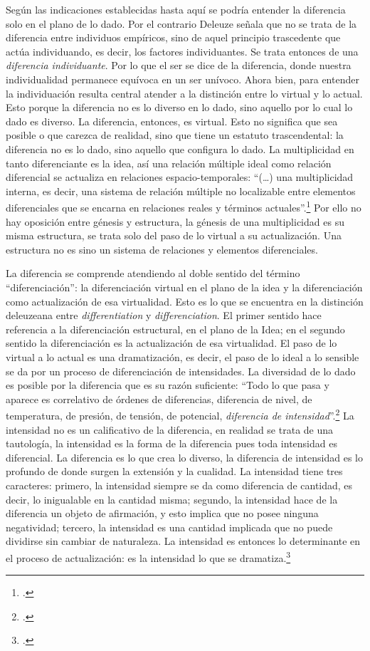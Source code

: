 Según las indicaciones establecidas hasta aquí se podría entender la
diferencia solo en el plano de lo dado. Por el contrario Deleuze señala
que no se trata de la diferencia entre individuos empíricos, sino de
aquel principio trascedente que actúa individuando, es decir, los
factores individuantes. Se trata entonces de una \emph{diferencia
individuante}. Por lo que el ser se dice de la diferencia, donde nuestra
individualidad permanece equívoca en un ser unívoco. Ahora bien, para
entender la individuación resulta central atender a la distinción entre
lo virtual y lo actual. Esto porque la diferencia no es lo diverso en lo
dado, sino aquello por lo cual lo dado es diverso. La diferencia,
entonces, es virtual. Esto no significa que sea posible o que carezca de
realidad, sino que tiene un estatuto trascendental: la diferencia no es
lo dado, sino aquello que configura lo dado. La multiplicidad en tanto
diferenciante es la idea, así una relación múltiple ideal como relación
diferencial se actualiza en relaciones espacio-temporales: \enquote{(\dots)
una multiplicidad interna, es decir, una sistema de relación múltiple no
localizable entre elementos diferenciales que se encarna en relaciones
reales y términos actuales}.\footcite[278]{deleuze2008} Por ello no hay oposición
entre génesis y estructura, la génesis de una multiplicidad es su misma
estructura, se trata solo del paso de lo virtual a su actualización. Una
estructura no es sino un sistema de relaciones y elementos
diferenciales.

La diferencia se comprende atendiendo al doble sentido del término
\enquote{diferenciación}: la diferenciación virtual en el plano de la idea y la
diferenciación como actualización de esa virtualidad. Esto es lo que se
encuentra en la distinción deleuzeana entre \emph{differentiation} y
\emph{differenciation}. El primer sentido hace referencia a la
diferenciación estructural, en el plano de la Idea; en el segundo
sentido la diferenciación es la actualización de esa virtualidad. El
paso de lo virtual a lo actual es una dramatización, es decir, el paso
de lo ideal a lo sensible se da por un proceso de diferenciación de
intensidades. La diversidad de lo dado es posible por la diferencia que
es su razón suficiente: \enquote{Todo lo que pasa y aparece es correlativo de
órdenes de diferencias, diferencia de nivel, de temperatura, de presión,
de tensión, de potencial, \emph{diferencia de intensidad}}.\footcite[333]{deleuze2008}
La intensidad no es un calificativo de la diferencia, en
realidad se trata de una tautología, la intensidad es la forma de la
diferencia pues toda intensidad es diferencial. La diferencia es lo que
crea lo diverso, la diferencia de intensidad es lo profundo de donde
surgen la extensión y la cualidad. La intensidad tiene tres caracteres:
primero, la intensidad siempre se da como diferencia de cantidad, es
decir, lo inigualable en la cantidad misma; segundo, la intensidad hace
de la diferencia un objeto de afirmación, y esto implica que no posee
ninguna negatividad; tercero, la intensidad es una cantidad implicada
que no puede dividirse sin cambiar de naturaleza. La intensidad es
entonces lo determinante en el proceso de actualización: es la
intensidad lo que se dramatiza.\footcite{deleuze2005c}

